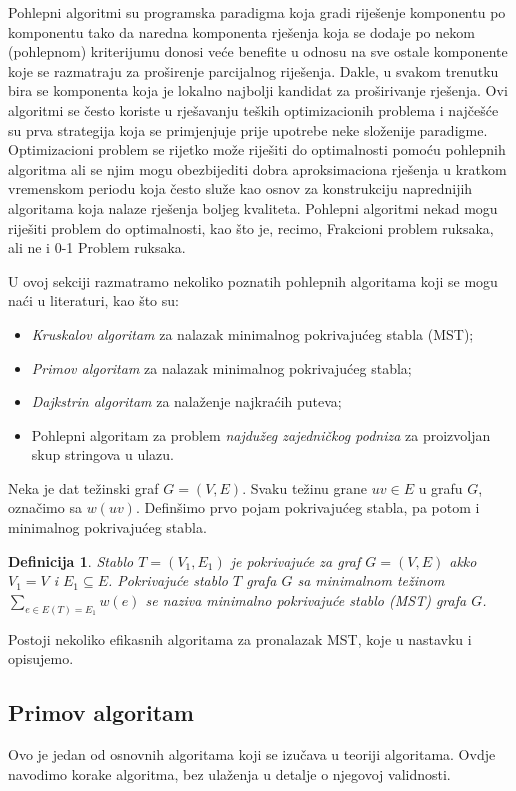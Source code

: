\documentclass[a4paper, utf8, 11pt, colorlinks]{book}
\newtheorem{definition}{Definicija}
\begin{document}
Pohlepni algoritmi su programska paradigma koja gradi riješenje komponentu po komponentu tako da  naredna komponenta rješenja koja se dodaje po nekom (pohlepnom) kriterijumu donosi veće benefite u odnosu na sve ostale komponente koje se razmatraju za proširenje   parcijalnog riješenja. Dakle, u svakom trenutku bira se komponenta koja je lokalno najbolji kandidat za proširivanje rješenja.  Ovi algoritmi se često koriste u rješavanju teških optimizacionih problema i najčešće su prva strategija koja se primjenjuje prije 
upotrebe neke složenije paradigme. Optimizacioni problem se rijetko može riješiti do optimalnosti  pomoću pohlepnih algoritma ali se   njim mogu obezbijediti dobra aproksimaciona rješenja u kratkom vremenskom periodu koja često služe kao osnov za konstrukciju naprednijih algoritama koja nalaze  rješenja boljeg kvaliteta. Pohlepni algoritmi nekad mogu riješiti problem do optimalnosti, kao što je, recimo, Frakcioni problem ruksaka, ali ne i 0-1 Problem ruksaka. 

U ovoj sekciji razmatramo nekoliko poznatih pohlepnih algoritama koji se mogu naći u literaturi, kao što su:
\begin{itemize}
	\item  \emph{Kruskalov algoritam} za nalazak minimalnog pokrivajućeg stabla (MST);
	\item  \emph{Primov algoritam} za nalazak minimalnog pokrivajućeg stabla;
	\item  \emph{Dajkstrin algoritam} za nalaženje najkraćih puteva;
	\item  Pohlepni algoritam za problem \emph{najdužeg zajedničkog podniza} za proizvoljan skup stringova u ulazu.
\end{itemize}

Neka je dat težinski graf $G=(V,E)$. Svaku težinu grane $uv \in E $ u grafu $G$, označimo sa $w(uv)$. 
Definšimo prvo pojam pokrivajućeg stabla, pa potom i minimalnog pokrivajućeg stabla. 
\begin{definition}
  Stablo $T =(V_1, E_1)$ je pokrivajuće za graf $G=(V,E)$ akko
  $V_1 = V$ i $E_1 \subseteq E$. Pokrivajuće stablo $T$ grafa $G$ sa minimalnom težinom 
  $\sum_{e \in E(T)=E_1} w(e)$ se naziva minimalno pokrivajuće stablo (MST) grafa $G$. 
\end{definition}
Postoji nekoliko efikasnih algoritama za pronalazak MST, koje u nastavku i opisujemo. 


\subsection{Primov algoritam}
Ovo je jedan od osnovnih algoritama koji se izučava u teoriji algoritama. Ovdje navodimo korake algoritma, bez ulaženja u detalje o njegovoj validnosti.
\end{document}
